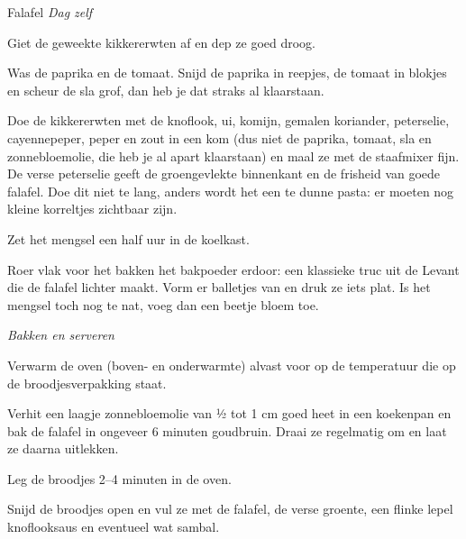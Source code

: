 \begin{recipe}{Falafel}
\medskip
\noindent\textit{Dag zelf}
\begin{steps}
  \item Giet de geweekte kikkererwten af en dep ze goed droog.
  \item Was de paprika en de tomaat. Snijd de paprika in reepjes, de tomaat in blokjes en scheur de sla
        grof, dan heb je dat straks al klaarstaan.
  \item Doe de kikkererwten met de knoflook, ui, komijn, gemalen koriander,
        peterselie, cayennepeper, peper en zout in een kom (dus niet de
        paprika, tomaat, sla en zonnebloemolie, die heb je al apart
        klaarstaan) en maal ze met de staafmixer fijn. De verse peterselie geeft de
        groengevlekte binnenkant en de frisheid van goede falafel. Doe dit
        niet te lang, anders wordt het een te dunne pasta: er moeten nog
        kleine korreltjes zichtbaar zijn.
  \item Zet het mengsel een half uur in de koelkast.
  \item Roer vlak voor het bakken het bakpoeder erdoor: een klassieke truc
        uit de Levant die de falafel lichter maakt. Vorm er balletjes van en
        druk ze iets plat. Is het mengsel toch nog te nat, voeg dan een
        beetje bloem toe.
\end{steps}

\medskip
\noindent\textit{Bakken en serveren}
\begin{steps}
  \item Verwarm de oven (boven- en onderwarmte) alvast voor op de
        temperatuur die op de broodjesverpakking staat.
  \item Verhit een laagje zonnebloemolie van ½ tot 1 cm goed heet in een
        koekenpan en bak de falafel in ongeveer 6 minuten goudbruin. Draai
        ze regelmatig om en laat ze daarna uitlekken.
  \item Leg de broodjes 2--4 minuten in de oven.
  \item Snijd de broodjes open en vul ze met de falafel, de verse groente,
        een flinke lepel knoflooksaus en eventueel wat sambal.
\end{steps}

\end{recipe}
